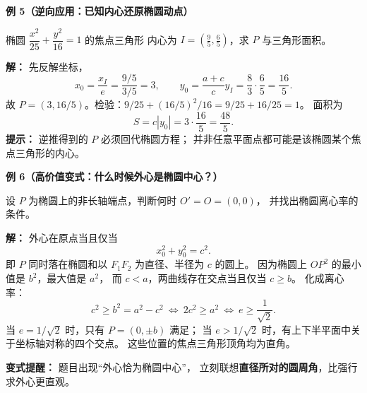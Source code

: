\begin{examplebox}
\tcbline
\textbf{例 5（逆向应用：已知内心还原椭圆动点）}

椭圆 $\dfrac{x^2}{25}+\dfrac{y^2}{16}=1$ 的焦点三角形
内心为 $I=(\tfrac95,\tfrac65)$，求 $P$ 与三角形面积。

\textbf{解：} 先反解坐标，
\[
 x_0=\frac{x_I}{e}=\frac{9/5}{3/5}=3,
 \qquad
 y_0=\frac{a+c}{c}y_I=\frac83\cdot\frac65=\frac{16}{5}.
\]
故 $P=(3,16/5)$。检验：$9/25+(16/5)^2/16=9/25+16/25=1$。
面积为
\[
 \boxed{S=c|y_0|=3\cdot\frac{16}{5}=\frac{48}{5}}.
\]
\textbf{提示：} 逆推得到的 $P$ 必须回代椭圆方程；
并非任意平面点都可能是该椭圆某个焦点三角形的内心。

\tcbline
\textbf{例 6（高价值变式：什么时候外心是椭圆中心？）}

设 $P$ 为椭圆上的非长轴端点，判断何时 $O'=O=(0,0)$，
并找出椭圆离心率的条件。

\textbf{解：} 外心在原点当且仅当
\[
 x_0^2+y_0^2=c^2.
\]
即 $P$ 同时落在椭圆和以 $F_1F_2$ 为直径、半径为 $c$ 的圆上。
因为椭圆上 $OP^2$ 的最小值是 $b^2$，最大值是 $a^2$，
而 $c<a$，两曲线存在交点当且仅当 $c\ge b$。
化成离心率：
\[
 c^2\ge b^2=a^2-c^2
 \ \Longleftrightarrow\ 2c^2\ge a^2
 \ \Longleftrightarrow\
 \boxed{e\ge\frac{1}{\sqrt2}}.
\]
当 $e=1/\sqrt2$ 时，只有 $P=(0,\pm b)$ 满足；
当 $e>1/\sqrt2$ 时，有上下半平面中关于坐标轴对称的四个交点。
这些位置的焦点三角形顶角均为直角。

\textbf{变式提醒：} 题目出现“外心恰为椭圆中心”，
立刻联想\textbf{直径所对的圆周角}，比强行求外心更直观。
\end{examplebox}
